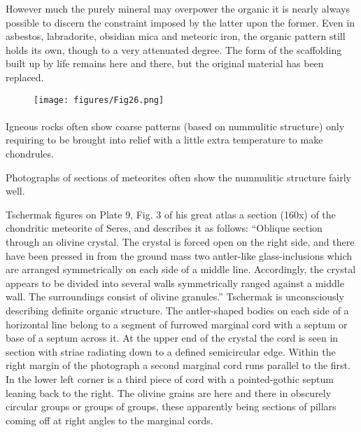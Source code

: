 \documentclass[a4paper, 12pt, oneside]{article}
\begin{document}
However much the purely mineral may overpower the organic it is nearly always possible to discern the constraint imposed by the latter upon the former. Even in asbestos, labradorite, obsidian mica and meteoric iron, the organic pattern still holds its own, though to a very attenuated degree. The form of the scaffolding built up by life remains here and there, but the original material has been replaced.
\begin{figure}[H]
\centering
\texttt{[image: figures/Fig26.png]}
\caption*{}
\end{figure}
\paragraph{}
Igneous rocks often show coarse patterns (based on nummulitic structure) only requiring to be brought into relief with a little extra temperature to make chondrules.

Photographs of sections of meteorites often show the nummulitic structure fairly well.

Tschermak figures on Plate 9, Fig. 3 of his great atlas a section (160x) of the chondritic meteorite of Seres, and describes it as follows: ``Oblique section through an olivine crystal. The crystal is forced open on the right side, and there have been pressed in from the ground mass two antler-like glass-inclusions which are arranged symmetrically on each side of a middle line. Accordingly, the crystal appears to be divided into several walls symmetrically ranged against a middle wall. The surroundings consist of olivine granules.'' Tschermak is unconsciously describing definite organic structure. The antler-shaped bodies on each side of a horizontal line belong to a segment of furrowed marginal cord with a septum or base of a septum across it. At the upper end of the crystal the cord is seen in section with striae radiating down to a defined semicircular edge. Within the right margin of the photograph a second marginal cord runs parallel to the first. In the lower left corner is a third piece of cord with a pointed-gothic septum leaning back to the right. The olivine grains are here and there in obscurely circular groups or groups of groups, these apparently being sections of pillars coming off at right angles to the marginal cords.
\end{document}
